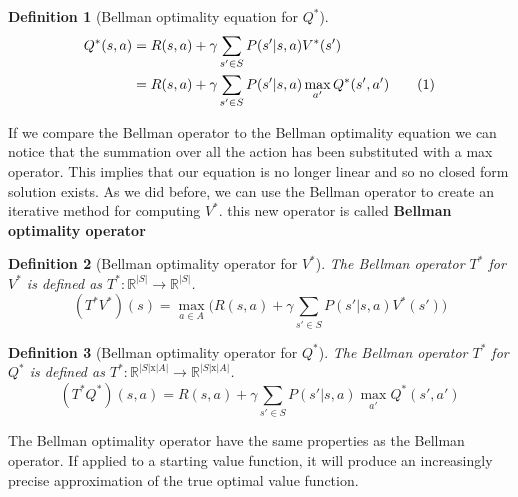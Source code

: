 \documentclass[main.tex]{subfiles}
\newcommand\numberthis{\addtocounter{equation}{1}\tag{\theequation}}
\newtheorem{definition}{Definition}[section]
\begin{document}
\begin{definition}[Bellman optimality equation for $Q^*$]
\begin{align*}
    Q^*(s,a) &= R(s,a) + \gamma \sum_{s' \in S} P(s'|s,a)V^*(s') \\
    &= R(s,a) + \gamma \sum_{s' \in S} P(s'|s,a) \max_{a'} Q^*(s',a') \numberthis
\end{align*}
\end{definition}
If we compare the Bellman operator to the Bellman optimality equation we can notice that the summation over all the action has been substituted with a max operator. This implies that our equation is no longer linear and so no closed form solution exists. As we did before, we can use the Bellman operator to create an iterative method for computing $V^*$. this new operator is called \textbf{Bellman optimality operator}
\begin{definition}[Bellman optimality operator for $V^*$]
The Bellman operator $T^*$ for $V^*$ is defined as $T^*:\mathbb{R}^{|S|} \rightarrow \mathbb{R}^{|S|}$\footnotemark.
\begin{equation}
    (T^*V^*)(s) = \max_{a \in A} \bigg( R(s,a) + \gamma \sum_{s' \in S} P(s'|s,a) V^*(s') \bigg)
\end{equation}
\end{definition}

\begin{definition}[Bellman optimality operator for $Q^*$]
The Bellman operator $T^*$ for $Q^*$ is defined as $T^*:\mathbb{R}^{|S|\text{x}|A|} \rightarrow \mathbb{R}^{|S|\text{x}|A|}$.
\begin{equation}
    (T^*Q^*)(s,a) =  R(s,a) + \gamma \sum_{s' \in S} P(s'|s,a) \max_{a'} Q^*(s',a')
\end{equation}
\end{definition}
The Bellman optimality operator have the same properties as the Bellman operator. If applied to a starting value function, it will produce an increasingly precise approximation of the true optimal value function.
\end{document}

